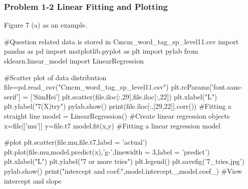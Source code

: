 \documentclass[12pt]{article}
\begin{document}
\subsubsection*{Problem 1-2 Linear Fitting and Plotting}
Figure 7 (a) as an example.
\begin{python}
#Question related data is stored in Cmcm_word_tag_sp_level11.csv
    import pandas as pd
    import matplotlib.pyplot as plt
    import pylab
    from sklearn.linear_model import LinearRegression 

    #Scatter plot of data distribution
    file=pd.read_csv("Cmcm_word_tag_sp_level11.csv")
    plt.rcParams['font.sans-serif'] = ['SimHei']  
    plt.scatter(file.iloc[:,29],file.iloc[:,22])
    plt.xlabel("L")
    plt.ylabel("7(X)try")
    pylab.show()
    print(file.iloc[:,[29,22]].corr())
    #Fitting a straight line
    model = LinearRegression() #Create linear regression objects
    x=file[['mu']] 
    y=file.t7
    model.fit(x,y) #Fitting a linear regression model

    #plot
    plt.scatter(file.mu,file.t7,label = 'actual')
    plt.plot(file.mu,model.predict(x),'g-',linewidth = 3,label = 'predict')
    plt.xlabel("L")
    plt.ylabel("7 or more tries")
    plt.legend()
    plt.savefig('7_tries.jpg')
    pylab.show()
    print("intercept and coef:",model.intercept_,model.coef_) 
    #View intercept and slope
\end{python}
\end{document}
